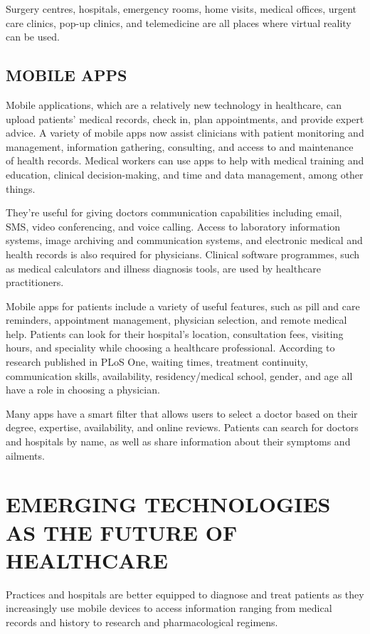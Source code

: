 \documentclass{article}
\begin{document}
Surgery centres, hospitals, emergency rooms, home visits, medical offices, urgent care clinics, pop-up clinics, and telemedicine are all places where virtual reality can be used.

\subsection{MOBILE APPS}

Mobile applications, which are a relatively new technology in healthcare, can upload patients' medical records, check in, plan appointments, and provide expert advice.
A variety of mobile apps now assist clinicians with patient monitoring and management, information gathering, consulting, and access to and maintenance of health records.
Medical workers can use apps to help with medical training and education, clinical decision-making, and time and data management, among other things.


They're useful for giving doctors communication capabilities including email, SMS, video conferencing, and voice calling.
Access to laboratory information systems, image archiving and communication systems, and electronic medical and health records is also required for physicians.
Clinical software programmes, such as medical calculators and illness diagnosis tools, are used by healthcare practitioners.


Mobile apps for patients include a variety of useful features, such as pill and care reminders, appointment management, physician selection, and remote medical help.
Patients can look for their hospital's location, consultation fees, visiting hours, and speciality while choosing a healthcare professional.
According to research published in PLoS One, waiting times, treatment continuity, communication skills, availability, residency/medical school, gender, and age all have a role in choosing a physician.


Many apps have a smart filter that allows users to select a doctor based on their degree, expertise, availability, and online reviews.
Patients can search for doctors and hospitals by name, as well as share information about their symptoms and ailments.

\section{EMERGING TECHNOLOGIES AS THE FUTURE OF HEALTHCARE}

Practices and hospitals are better equipped to diagnose and treat patients as they increasingly use mobile devices to access information ranging from medical records and history to research and pharmacological regimens.
\end{document}
